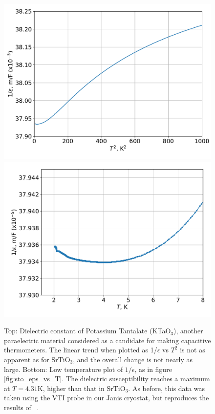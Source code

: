\documentclass{thesis-umich}
\begin{document}
\begin{figure} \caption[Dielectric constant of Potassium Tantalate]{Top: Dielectric constant of Potassium Tantalate
		(KTaO$_3$), another paraelectric material considered as a
		candidate for making capacitive thermometers. The linear trend
		when plotted as 1/$\epsilon$ vs $T^2$ is not as apparent as for
		SrTiO$_3$, and the overall change is not nearly as large.
		Bottom: Low temperature plot of $1/\epsilon$, as in figure
		\ref{fig:sto_eps_vs_T}. The dielectric susceptibility reaches a
		maximum at $T = 4.31$K, higher than that in SrTiO$_3$. As
		before, this data was taken using the VTI probe in our Janis
		cryostat, but reproduces the results of ~\cite{Rowley2014}.}
		\label{fig:kto_eps_vs_T}
	\includegraphics[width=0.85\columnwidth]{figures/KTO_eps_vs_T.pdf}
	\includegraphics[width=0.85\columnwidth]{figures/KTO_eps_vs_T_low.pdf}
\end{figure}
\end{document}

